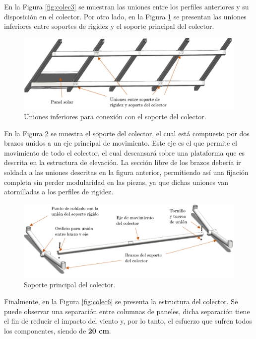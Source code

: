 En la Figura \ref{fig:colec3} se muestran las uniones entre los perfiles anteriores y su disposición en el colector. Por otro lado, en la Figura \ref{fig:colec4} se presentan las uniones inferiores entre soportes de rigidez y el soporte principal del colector.

\begin{figure}[H]
	\centering
	\includegraphics[width=12cm]{imagenes/colec4}
	\caption{Uniones inferiores para conexión con el soporte del colector.}
	\label{fig:colec4}
\end{figure}

En la Figura \ref{fig:colec5} se muestra el soporte del colector, el cual está compuesto por dos brazos unidos a un eje principal de movimiento. Este eje es el que permite el movimiento de todo el colector, el cual descansará sobre una plataforma que es descrita en la estructura de elevación. La sección libre de los brazos debería ir soldada a las uniones descritas en la figura anterior, permitiendo así una fijación completa sin perder modularidad en las piezas, ya que dichas uniones van atornilladas a los perfiles de rigidez.

\begin{figure}[H]
	\centering
	\includegraphics[width=13cm]{imagenes/colec5}
	\caption{Soporte principal del colector.}
	\label{fig:colec5}
\end{figure}

Finalmente, en la Figura \ref{fig:colec6} se presenta la estructura del colector. Se puede observar una separación entre columnas de paneles, dicha separación tiene el fin de reducir el impacto del viento y, por lo tanto, el esfuerzo que sufren todos los componentes, siendo de \textbf{20 cm}.

